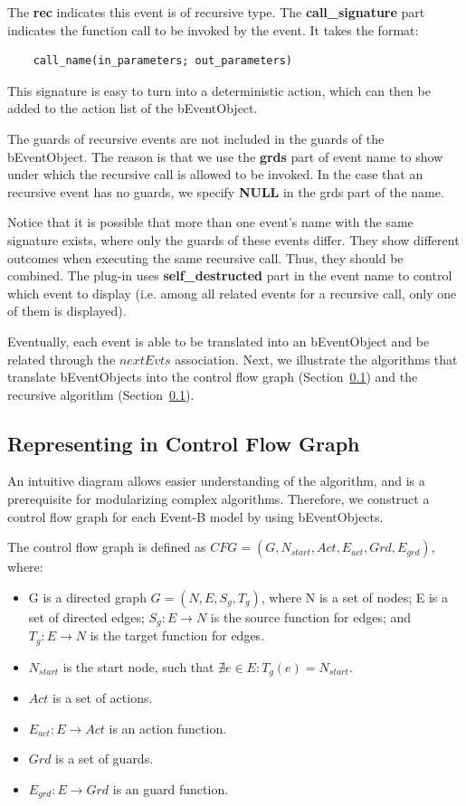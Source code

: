 \documentclass{easychair}
\begin{document}
The \textbf{rec} indicates this event is of recursive type. The \textbf{call\_signature} part indicates the function call to be invoked by the event. It takes the format:
\lstset{language=[68]Algol}
\begin{lstlisting}
	call_name(in_parameters; out_parameters)
\end{lstlisting} 
This signature is easy to turn into a deterministic action, which can then be added to the action list of the bEventObject. 

The guards of recursive events are not included in the guards of the bEventObject. The reason is that we use the \textbf{grds} part of event name to show under which the recursive call is allowed to be invoked. In the case that an recursive event has no guards, we specify \textbf{NULL} in the grds part of the name. 

Notice that it is possible that more than one event's name with the same signature exists, where only the guards of these events differ. They show different outcomes when executing the same recursive call. Thus, they should be combined. The plug-in uses \textbf{self\_destructed} part in the event name to control which event to display (i.e. among all related events for a recursive call, only one of them is displayed). 

Eventually, each event is able to be translated into an bEventObject and be related through the $nextEvts$ association. Next, we illustrate the algorithms that translate bEventObjects into the control flow graph (Section~\ref{}) and the recursive algorithm (Section~\ref{}).


\subsection{Representing in Control Flow Graph} 
An intuitive diagram allows easier understanding of the algorithm, and is a prerequisite for modularizing complex algorithms. Therefore, we construct a control flow graph for each Event-B model by using bEventObjects.

The control flow graph is defined as $CFG = (G, N_{start}, Act, E_{act}, Grd, E_{grd})$, where:
\begin{itemize}
	\item G is a directed graph $G = (N, E, S_g, T_g)$, where N is a set of nodes; E is a set of directed edges; $S_g : E \rightarrow N $ is the source function for edges; and $T_g : E \rightarrow N$ is the target function for edges.
	\item $N_{start}$ is the start node, such that $\nexists e \in E : T_g(e) = N_{start}$.
	\item $Act$ is a set of actions.
	\item $E_{act} : E \rightarrow Act$ is an action function. 
	\item $Grd$ is a set of guards.
	\item $E_{grd} : E \rightarrow Grd$ is an guard function.
\end{itemize}
\end{document}
